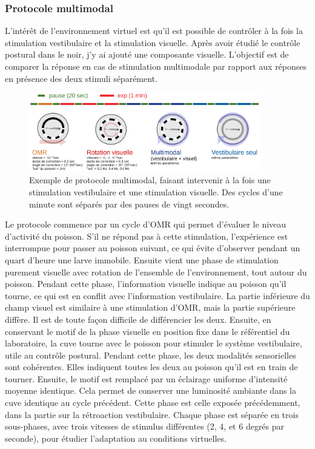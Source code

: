 \subsubsection{Protocole multimodal}
L'intérêt de l'environnement virtuel est qu'il est possible de contrôler à la fois la stimulation vestibulaire et la stimulation visuelle. Après avoir étudié le contrôle postural dans le noir, j'y ai ajouté une composante visuelle. L'objectif est de comparer la réponse en cas de stimulation multimodale par rapport aux réponses en présence des deux stimuli séparément.

\begin{figure}
\centering
\includegraphics[width=0.9\textwidth]{./files/protocole_multimodal.svg.png}
\caption{
Exemple de protocole multimodal, faisant intervenir à la fois une stimulation vestibulaire et une stimulation visuelle. Des cycles d'une minute sont séparés par des pauses de vingt secondes.
}
\end{figure}

Le protocole commence par un cycle d'OMR qui permet d'évaluer le niveau d'activité du poisson. S'il ne répond pas à cette stimulation, l'expérience est interrompue pour passer au poisson suivant, ce qui évite d'observer pendant un quart d'heure une larve immobile. Ensuite vient une phase de stimulation purement visuelle avec rotation de l'ensemble de l'environnement, tout autour du poisson. Pendant cette phase, l'information visuelle indique au poisson qu'il tourne, ce qui est en conflit avec l'information vestibulaire. La partie inférieure du champ visuel est similaire à une stimulation d'OMR, mais la partie supérieure diffère. Il est de toute façon difficile de différencier les deux. Ensuite, en conservant le motif de la phase visuelle en position fixe dans le référentiel du laboratoire, la cuve tourne avec le poisson pour stimuler le système vestibulaire, utile au contrôle postural. Pendant cette phase, les deux modalités sensorielles sont cohérentes. Elles indiquent toutes les deux au poisson qu'il est en train de tourner. Ensuite, le motif est remplacé par un éclairage uniforme d'intensité moyenne identique. Cela permet de conserver une luminosité ambiante dans la cuve identique au cycle précédent. Cette phase est celle exposée précédemment, dans la partie sur la rétroaction vestibulaire. Chaque phase est séparée en trois sous-phases, avec trois vitesses de stimulus différentes (2, 4, et 6 degrés par seconde), pour étudier l'adaptation au conditions virtuelles.

